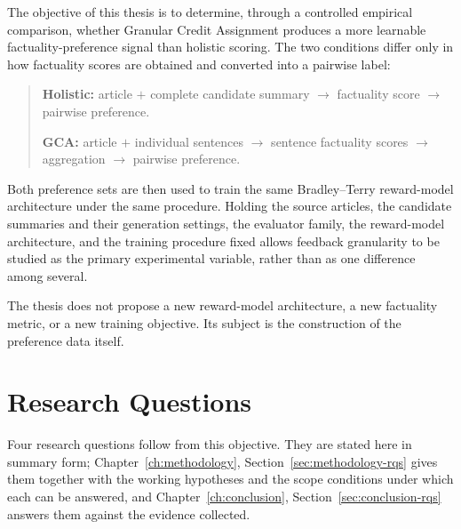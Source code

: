 The objective of this thesis is to determine, through a controlled empirical
comparison, whether Granular Credit Assignment produces a more learnable
factuality-preference signal than holistic scoring. The two conditions differ only
in how factuality scores are obtained and converted into a pairwise label:

\begin{quote}
\textbf{Holistic:} article $+$ complete candidate summary $\rightarrow$ factuality
score $\rightarrow$ pairwise preference.

\textbf{GCA:} article $+$ individual sentences $\rightarrow$ sentence factuality
scores $\rightarrow$ aggregation $\rightarrow$ pairwise preference.
\end{quote}

Both preference sets are then used to train the same Bradley--Terry reward-model
architecture under the same procedure. Holding the source articles, the candidate
summaries and their generation settings, the evaluator family, the reward-model
architecture, and the training procedure fixed allows feedback granularity to be
studied as the primary experimental variable, rather than as one difference among
several.

The thesis does not propose a new reward-model architecture, a new factuality
metric, or a new training objective. Its subject is the construction of the
preference data itself.

\section{Research Questions}
\label{sec:intro-rqs}

Four research questions follow from this objective. They are stated here in
summary form; Chapter~\ref{ch:methodology},
Section~\ref{sec:methodology-rqs} gives them together with the working hypotheses
and the scope conditions under which each can be answered, and
Chapter~\ref{ch:conclusion}, Section~\ref{sec:conclusion-rqs} answers them
against the evidence collected.

